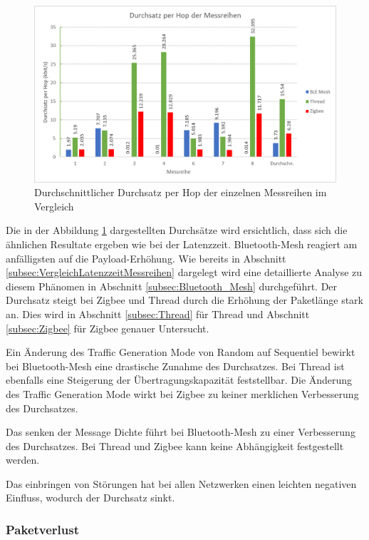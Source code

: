 \begin{figure}[h]
	\centering
	\includegraphics[width=1.0\textwidth]{graphics/Durchsatz_per_Hop_Messreihen.png}
	\caption{Durchschnittlicher Durchsatz per Hop der einzelnen Messreihen im Vergleich}\label{fig:Durchsätze_per_Hop_Messreihen}
\end{figure}


Die in der Abbildung \ref{fig:Durchsätze_per_Hop_Messreihen} dargestellten Durchsätze wird ersichtlich, dass sich die ähnlichen Resultate ergeben wie bei der Latenzzeit. Bluetooth-Mesh reagiert am anfälligsten auf die Payload-Erhöhung. Wie bereits in Abschnitt \ref{subsec:VergleichLatenzzeitMessreihen} dargelegt wird eine detaillierte Analyse zu diesem Phänomen in Abschnitt \ref{subsec:Bluetooth_Mesh} durchgeführt. Der Durchsatz steigt bei Zigbee und Thread durch die Erhöhung der Paketlänge stark an. Dies wird in Abschnitt \ref{subsec:Thread} für Thread und Abschnitt \ref{subsec:Zigbee} für Zigbee genauer Untersucht.

Ein Änderung des Traffic Generation Mode von Random auf Sequentiel bewirkt bei Bluetooth-Mesh eine drastische Zunahme des Durchsatzes. Bei Thread ist ebenfalls eine Steigerung der Übertragungskapazität feststellbar. Die Änderung des Traffic Generation Mode wirkt bei Zigbee zu keiner merklichen Verbesserung des Durchsatzes.

Das senken der Message Dichte führt bei Bluetooth-Mesh zu einer Verbesserung des Durchsatzes. Bei Thread und Zigbee kann keine Abhängigkeit festgestellt werden.

Das einbringen von Störungen hat bei allen Netzwerken einen leichten negativen Einfluss, wodurch der Durchsatz sinkt. 

\subsubsection{Paketverlust}\label{subsec:VergleichPaketverlustMessreihen}



